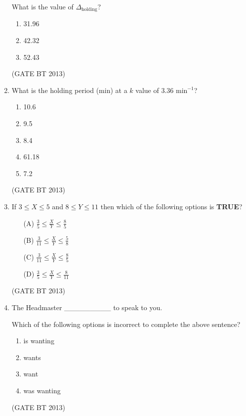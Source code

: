 \documentclass[journal,12pt,onecolumn]{IEEEtran}
\theoremstyle{remark}
\begin{document}
\begin{enumerate}
What is the value of \(\Delta_{\text{holding}}\)?

\begin{enumerate}[label=(\Alph*)]
    \item 31.96
    \item 42.32
    \item 52.43
\end{enumerate} \hfill(GATE BT 2013)

\item 

What is the holding period (min) at a \(k\) value of \(3.36 \text{ min}^{-1}\)?

\begin{enumerate}[label=(\Alph*)]
    \item 10.6
    \item 9.5
    \item 8.4
    \item 61.18
    \item 7.2
\end{enumerate} \hfill(GATE BT 2013)

\item 
If \(3 \le X \le 5\) and \(8 \le Y \le 11\) then which of the following options is \textbf{TRUE}?

\begin{enumerate}
    \item[(A)] \(\frac{3}{5} \le \frac{X}{Y} \le \frac{8}{5}\)
    \item[(B)] \(\frac{3}{11} \le \frac{X}{Y} \le \frac{5}{8}\)
    \item[(C)] \(\frac{3}{11} \le \frac{X}{Y} \le \frac{8}{5}\)
    \item[(D)] \(\frac{3}{5} \le \frac{X}{Y} \le \frac{8}{11}\)
\end{enumerate} \hfill(GATE BT 2013)

\item 

The Headmaster \_\_\_\_\_\_\_\_\_ to speak to you. 

Which of the following options is incorrect to complete the above sentence?

\begin{enumerate}[label=(\Alph*)]
    \item is wanting
    \item wants
    \item want
    \item was wanting
\end{enumerate} \hfill(GATE BT 2013)


\end{enumerate}
\end{document}
